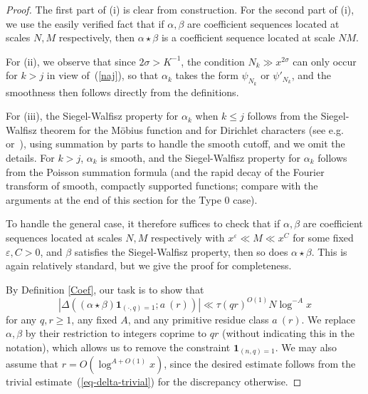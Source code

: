 \documentclass[12pt,a4paper,reqno]{amsart}
\numberwithin{equation}{section}
\theoremstyle{plain}
\theoremstyle{definition}
\newcommand\eps{\varepsilon}
\newcommand{\onef}{\mathbf{1}}
\begin{document}
\begin{proof} 
  The first part of (i) is clear from construction.  For the second
  part of (i), we use the easily verified fact that if $\alpha,\beta$
  are coefficient sequences located at scales $N,M$ respectively, then
  $\alpha\star \beta$ is a coefficient sequence located at scale $NM$.

  For (ii), we observe that since $2\sigma >K^{-1}$, the condition
  $N_k\gg x^{2\sigma}$ can only occur for $k > j$ in view
  of~(\ref{naj}), so that $\alpha_k$ takes the form $\psi_{N_k}$ or
  $\psi'_{N_k}$, and the smoothness then follows directly from the
  definitions.

  For (iii), the Siegel-Walfisz property for $\alpha_k$ when $k \leq j$
  follows from the Siegel-Walfisz theorem for the M\"obius function
  and for Dirichlet characters (see e.g. \cite[Satz 4]{siebert}
  or~\cite[Th. 5.29]{ik}), using summation by parts to handle the
  smooth cutoff, and we omit the details.  For $k > j$, $\alpha_k$ is
  smooth, and the Siegel-Walfisz property for $\alpha_k$ follows from
  the Poisson summation formula (and the rapid decay of the Fourier
  transform of smooth, compactly supported functions; compare with the
  arguments at the end of this section for the Type 0 case).

  To handle the general case, it therefore suffices to check that if
  $\alpha,\beta$ are coefficient sequences located at scales $N,M$
  respectively with $x^\eps \ll M \ll x^C$ for some fixed $\eps,C>0$,
  and $\beta$ satisfies the Siegel-Walfisz property, then so does
  $\alpha\star \beta$. This is again relatively standard, but we give
  the proof for completeness.

  By Definition \ref{Coef}, our task is to show that
$$
| \Delta((\alpha \star \beta) \onef_{(\cdot,q)=1}; a\ (r)) | \ll
\tau(qr)^{O(1)} N \log^{-A} x
$$
for any $q,r \geq 1$, any fixed $A$, and any primitive residue class
$a\ (r)$.  We replace $\alpha,\beta$ by their restriction to integers
coprime to $qr$ (without indicating this in the notation), which allows
us to remove the constraint $\onef_{(n,q)=1}$. We may also assume that
$r = O( \log^{A+O(1)} x)$, since the desired estimate follows from the
trivial estimate~(\ref{eq-delta-trivial}) for the discrepancy
otherwise.


\end{proof}
\end{document}

